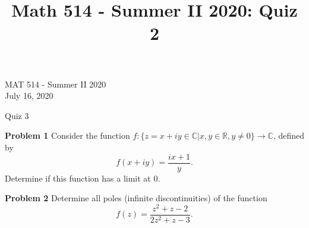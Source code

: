 \documentclass[12pt,oneside]{exam}
\title{Math 514 - Summer II 2020: Quiz 2}
\newenvironment{exercise}[1]{\vspace{.1in}\noindent\textbf{Problem #1 \hspace{.05em}}}{}
\newcommand{\func}[3]{{#1} : {#2} \longrightarrow {#3}}
\begin{document}
\begin{flushright}
\sc MAT 514 - Summer II 2020\\
July 16, 2020
\end{flushright}
\bigskip
 
\begin{center}
\textsf{Quiz 3} 
\end{center}


\begin{exercise}{1}
Consider the function $\func{f}{\{z = x + iy \in \mathbb{C}| x,y \in \mathbb{R}, y \neq 0\}}{\mathbb{C}}$, defined by 
\begin{equation*}
f(x+iy) = \frac{ix+1}{y}.
\end{equation*}
Determine if this function has a limit at $0$. 
\end{exercise}

\vfill
\begin{exercise}{2}
Determine all poles (infinite discontinuities) of the function
\begin{equation*}
f(z) = \frac{z^2+z-2}{2z^2+z-3}.
\end{equation*}
\end{exercise}
\vfill
\end{document}
